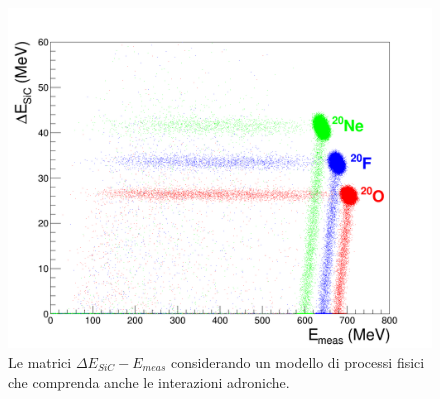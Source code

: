 \begin{figure} [!t]
	\centering
	\includegraphics[width=\textwidth, keepaspectratio]{Grafici_Tesi2/Interazioni_adroniche/deltaE_ETot_quadrata.png}
	\caption{Le matrici $\Delta E_{SiC} - E_{meas}$ considerando un modello di processi fisici che comprenda anche le interazioni adroniche.} \label{fig:deltaE_ERes_adron}
\end{figure}








\subsection{}

